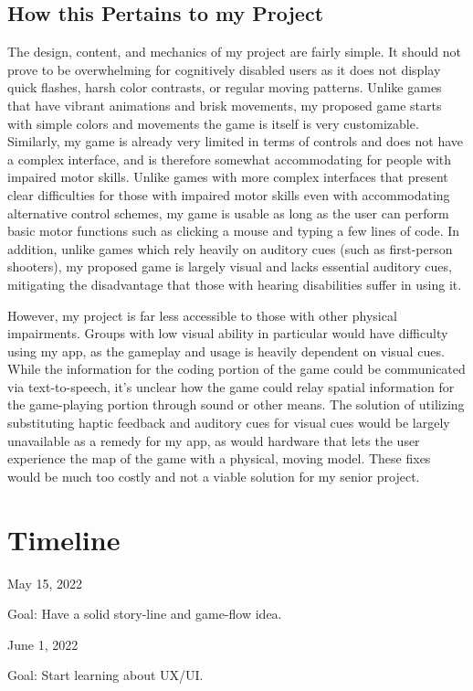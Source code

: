 \documentclass[10pt,twocolumn]{article}
\begin{document}
\subsection{How this Pertains to my Project}
 The design, content, and mechanics of my project are fairly simple. It should not prove to be overwhelming for cognitively disabled users as it does not display quick flashes, harsh color contrasts, or regular moving patterns. Unlike games that have vibrant animations and brisk movements, my proposed game starts with simple colors and movements the game is itself is very customizable. Similarly, my game is already very limited in terms of controls and does not have a complex interface, and is therefore somewhat accommodating for people with impaired motor skills. Unlike games with more complex interfaces that present clear difficulties for those with impaired motor skills even with accommodating alternative control schemes, my game is usable as long as the user can perform basic motor functions such as clicking a mouse and typing a few lines of code. In addition, unlike games which rely heavily on auditory cues (such as first-person shooters), my proposed game is largely visual and lacks essential auditory cues, mitigating the disadvantage that those with hearing disabilities suffer in using it.
    
However, my project is far less accessible to those with other physical impairments. Groups with low visual ability in particular would have difficulty using my app, as the gameplay and usage is heavily dependent on visual cues. While the information for the coding portion of the game could be communicated via text-to-speech, it's unclear how the game could relay spatial information for the game-playing portion through sound or other means. The solution of utilizing substituting haptic feedback and auditory cues for visual cues would be largely unavailable as a remedy for my app, as would hardware that lets the user experience the map of the game with a physical, moving model. These fixes would be much too costly and not a viable solution for my senior project.




\section{Timeline}
May 15, 2022

Goal: Have a solid story-line and game-flow idea.

June 1, 2022

Goal: Start learning about UX/UI.
\end{document}
